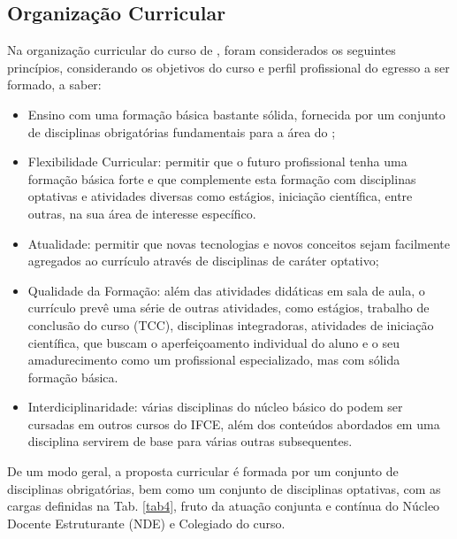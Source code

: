 \documentclass{paper}
\begin{document}
\subsection{Organização Curricular}
Na organização curricular do curso de \NOMECURSO, foram considerados os seguintes princípios, considerando os objetivos do curso e perfil profissional do egresso a ser formado, a saber: 
\begin{itemize}
    \item Ensino com uma formação básica bastante sólida, fornecida por um conjunto de disciplinas obrigatórias fundamentais para a área do \NOMECURSO ;
    \item Flexibilidade Curricular: permitir que o futuro profissional tenha uma formação básica forte e que complemente esta formação com disciplinas optativas e atividades diversas como estágios, iniciação científica, entre outras, na sua área de interesse específico.
    \item Atualidade: permitir que novas tecnologias e novos conceitos sejam facilmente agregados ao currículo através de disciplinas de caráter optativo;
    \item Qualidade da Formação: além das atividades didáticas em sala de aula, o currículo prevê uma série de outras atividades, como estágios, trabalho de conclusão do curso (TCC), disciplinas integradoras, atividades de iniciação científica, que buscam o aperfeiçoamento individual do aluno e o seu amadurecimento como um profissional especializado, mas com sólida formação básica.
    \item Interdiciplinaridade: várias disciplinas do núcleo básico do \NOMECURSO podem ser cursadas em outros cursos do IFCE, além dos conteúdos abordados em uma disciplina servirem de base para várias outras subsequentes.
\end{itemize}

De um modo geral, a proposta curricular é formada por um conjunto de disciplinas obrigatórias, bem como um conjunto de disciplinas optativas, com as cargas definidas na Tab. \ref{tab4}, fruto da atuação conjunta e contínua do Núcleo Docente Estruturante (NDE) e Colegiado do curso.
\end{document}
